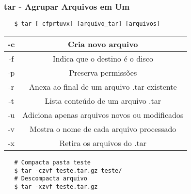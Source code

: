 \documentclass{beamer}
\begin{document}
\begin{frame}[fragile]
   \frametitle{tar - Agrupar Arquivos em Um}
   \begin{verbatim}
   $ tar [-cfprtuvx] [arquivo_tar] [arquivos]
   \end{verbatim}
   \begin{table}
      \begin{tabular}{ c | c }
         -c & Cria novo arquivo \\
         \hline 
         -f & Indica que o destino é o disco \\ 
         \hline
	 -p & Preserva permissões \\
         \hline 
         -r & Anexa ao final de um arquivo .tar existente \\ 
         \hline
         -t & Lista conteúdo de um arquivo .tar \\ 
         \hline
         -u & Adiciona apenas arquivos novos ou modificados  \\
         \hline 
         -v & Mostra o nome de cada arquivo processado \\ 
         \hline
         -x & Retira os arquivos do .tar \\ 
      \end{tabular}
   \end{table}
   \begin{verbatim}
   # Compacta pasta teste
   $ tar -czvf teste.tar.gz teste/
   # Descompacta arquivo
   $ tar -xzvf teste.tar.gz
   \end{verbatim}
\end{frame}
\end{document}

